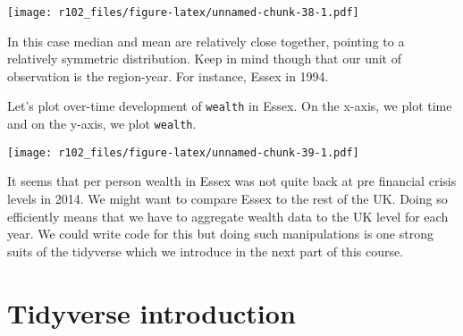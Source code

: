 \documentclass[]{article}
\newenvironment{Shaded}{\begin{snugshade}}{\end{snugshade}}
\newcommand{\DataTypeTok}[1]{\textcolor[rgb]{0.13,0.29,0.53}{#1}}
\newcommand{\DecValTok}[1]{\textcolor[rgb]{0.00,0.00,0.81}{#1}}
\newcommand{\FloatTok}[1]{\textcolor[rgb]{0.00,0.00,0.81}{#1}}
\newcommand{\KeywordTok}[1]{\textcolor[rgb]{0.13,0.29,0.53}{\textbf{#1}}}
\newcommand{\NormalTok}[1]{#1}
\newcommand{\OperatorTok}[1]{\textcolor[rgb]{0.81,0.36,0.00}{\textbf{#1}}}
\newcommand{\StringTok}[1]{\textcolor[rgb]{0.31,0.60,0.02}{#1}}
\begin{document}
\texttt{[image: r102\_files/figure-latex/unnamed-chunk-38-1.pdf]}

In this case median and mean are relatively close together, pointing to a relatively symmetric distribution. Keep in mind though that our unit of observation is the region-year. For instance, Essex in 1994.

Let's plot over-time development of \texttt{wealth} in Essex. On the x-axis, we plot time and on the y-axis, we plot \texttt{wealth}.

\begin{Shaded}
\end{Shaded}

\texttt{[image: r102\_files/figure-latex/unnamed-chunk-39-1.pdf]}

It seems that per person wealth in Essex was not quite back at pre financial crisis levels in 2014. We might want to compare Essex to the rest of the UK. Doing so efficiently means that we have to aggregate wealth data to the UK level for each year. We could write code for this but doing such manipulations is one strong suits of the tidyverse which we introduce in the next part of this course.

\hypertarget{tidyverse-introduction}{%
\section{Tidyverse introduction}\label{tidyverse-introduction}}
\end{document}
